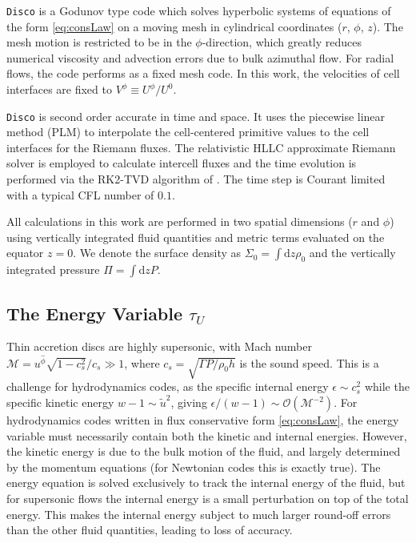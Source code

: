 \documentclass{emulateapj}
\newcommand{\eps}{\epsilon}
\newcommand{\Sig}{\Sigma}
\newcommand{\Mach}{\mathcal{M}}
\newcommand{\dd}{\mbox{d}}
\newcommand{\Disco}{{\texttt{Disco}}}
\newcommand{\OO}{\mathcal{O}}
\begin{document}
\Disco{} is a Godunov type code which solves hyperbolic systems of equations of the form \eqref{eq:consLaw} on a moving mesh in cylindrical coordinates ($r$, $\phi$, $z$).  The mesh motion is restricted to be in the $\phi$-direction, which greatly reduces numerical viscosity and advection errors due to bulk azimuthal flow.  For radial flows, the code performs as a fixed mesh code.  In this work, the velocities of cell interfaces are fixed to $V^\phi \equiv U^\phi/U^0$.   

\Disco{} is second order accurate in time and space.  It uses the piecewise linear method (PLM) to interpolate the cell-centered primitive values to the cell interfaces for the Riemann fluxes.  The relativistic HLLC approximate Riemann solver \citep{Mignone05} is employed to calculate intercell fluxes and the time evolution is performed via the RK2-TVD algorithm of \cite{Gottlieb98}.  The time step is Courant limited with a typical CFL number of $0.1$.

All calculations in this work are performed in two spatial dimensions ($r$ and $\phi$) using vertically integrated fluid quantities and metric terms evaluated on the equator $z=0$.  We denote the surface density as $\Sig_0 = \int \dd z \rho_0$ and the vertically integrated pressure $\Pi = \int \dd z P$.  

\subsection{The Energy Variable $\tau_U$}
\label{subsec:energy}

Thin accretion discs are highly supersonic, with Mach number $\Mach = u^{\hat{\phi}} \sqrt{1-c_s^2}/c_s \gg 1$, where $c_s = \sqrt{\Gamma P / \rho_0 h}$ is the sound speed.  This is a challenge for hydrodynamics codes, as the specific internal energy $\eps \sim c_s^2$ while the specific kinetic energy $w-1 \sim \tilde{u}^2$, giving $\eps / (w-1) \sim \OO(\Mach^{-2})$.  For hydrodynamics codes written in flux conservative form \eqref{eq:consLaw}, the energy variable must necessarily contain both the kinetic and internal energies.  However, the kinetic energy is due to the bulk motion of the fluid, and largely determined by the momentum equations (for Newtonian codes this is exactly true).  The energy equation is solved exclusively to track the internal energy of the fluid, but for supersonic flows the internal energy is a small perturbation on top of the total energy.  This makes the internal energy subject to much larger round-off errors than the other fluid quantities, leading to loss of accuracy.
\end{document}
